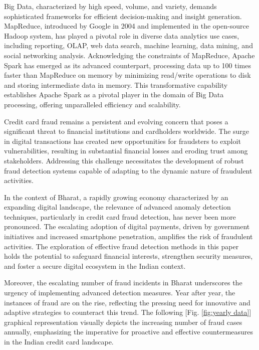 \documentclass[journal]{IEEEtran}
\begin{document}
Big Data, characterized by high speed, volume, and variety, demands sophisticated frameworks for efficient decision-making and insight generation. MapReduce, introduced by Google in 2004 and implemented in the open-source Hadoop system, has played a pivotal role in diverse data analytics use cases, including reporting, OLAP, web data search, machine learning, data mining, and social networking analysis. Acknowledging the constraints of MapReduce, Apache Spark has emerged as its advanced counterpart, processing data up to 100 times faster than MapReduce on memory by minimizing read/write operations to disk and storing intermediate data in memory. This transformative capability establishes Apache Spark as a pivotal player in the domain of Big Data processing, offering unparalleled efficiency and scalability.

Credit card fraud remains a persistent and evolving concern that poses a significant threat to financial institutions and cardholders worldwide. The surge in digital transactions has created new opportunities for fraudsters to exploit vulnerabilities, resulting in substantial financial losses and eroding trust among stakeholders. Addressing this challenge necessitates the development of robust fraud detection systems capable of adapting to the dynamic nature of fraudulent activities.

In the context of Bharat, a rapidly growing economy characterized by an expanding digital landscape, the relevance of advanced anomaly detection techniques, particularly in credit card fraud detection, has never been more pronounced. The escalating adoption of digital payments, driven by government initiatives and increased smartphone penetration, amplifies the risk of fraudulent activities. The exploration of effective fraud detection methods in this paper holds the potential to safeguard financial interests, strengthen security measures, and foster a secure digital ecosystem in the Indian context.

Moreover, the escalating number of fraud incidents in Bharat underscores the urgency of implementing advanced detection measures. Year after year, the instances of fraud are on the rise, reflecting the pressing need for innovative and adaptive strategies to counteract this trend. The following [Fig. \ref{fig:yearly data}] graphical representation visually depicts the increasing number of fraud cases annually, emphasizing the imperative for proactive and effective countermeasures in the Indian credit card landscape.
\end{document}

